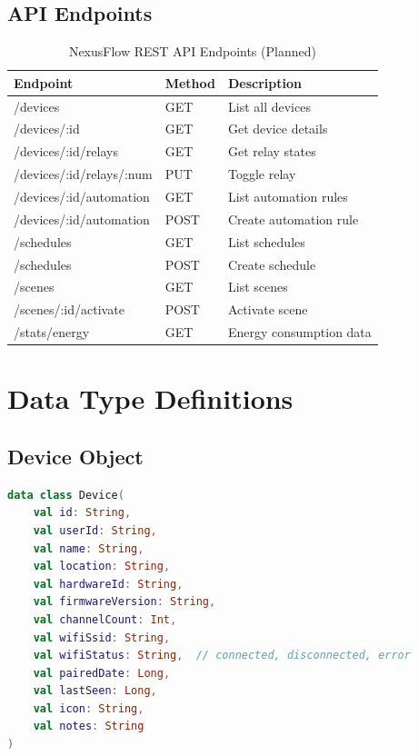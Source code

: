 \subsection{API Endpoints}

\begin{table}[H]
\centering
\caption{NexusFlow REST API Endpoints (Planned)}
\label{tbl:api_endpoints}
\begin{tabular}{|l|l|l|}
\hline
\textbf{Endpoint} & \textbf{Method} & \textbf{Description} \\
\hline
/devices & GET & List all devices \\
\hline
/devices/:id & GET & Get device details \\
\hline
/devices/:id/relays & GET & Get relay states \\
\hline
/devices/:id/relays/:num & PUT & Toggle relay \\
\hline
/devices/:id/automation & GET & List automation rules \\
\hline
/devices/:id/automation & POST & Create automation rule \\
\hline
/schedules & GET & List schedules \\
\hline
/schedules & POST & Create schedule \\
\hline
/scenes & GET & List scenes \\
\hline
/scenes/:id/activate & POST & Activate scene \\
\hline
/stats/energy & GET & Energy consumption data \\
\hline
\end{tabular}
\end{table}

\section{Data Type Definitions}

\subsection{Device Object}

\begin{lstlisting}[language=kotlin, caption=Device Data Structure, label=lst:device_object]
data class Device(
    val id: String,
    val userId: String,
    val name: String,
    val location: String,
    val hardwareId: String,
    val firmwareVersion: String,
    val channelCount: Int,
    val wifiSsid: String,
    val wifiStatus: String,  // connected, disconnected, error
    val pairedDate: Long,
    val lastSeen: Long,
    val icon: String,
    val notes: String
)
\end{lstlisting}

